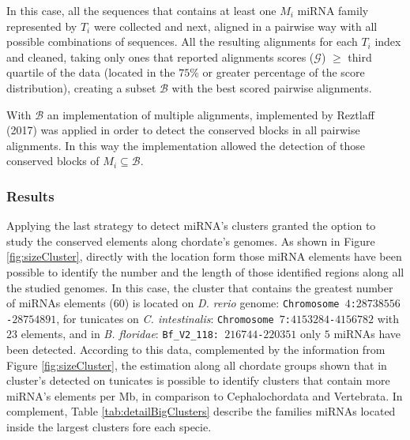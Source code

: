 \documentclass[11pt]{article}
\begin{document}
In this case, all the sequences that contains at least one $M_{i}$ miRNA family represented by $T_{i}$ were collected and next, aligned in a pairwise way with all possible combinations of sequences. All the resulting alignments for each $T_{i}$ index and cleaned, taking only ones that reported alignments scores ($\mathcal{G}$) $\ge$ third quartile of the data (located in the $75$\% or greater percentage of the score distribution), creating a subset $\mathcal{B}$ with the best scored pairwise alignments.

With $\mathcal{B}$ an implementation of multiple alignments, implemented by Reztlaff (2017) was applied in order to detect the conserved blocks in all pairwise alignments. In this way the implementation allowed the detection of those conserved blocks of $M_{i} \subseteq \mathcal{B}$.

\subsubsection*{Results}
 Applying the last strategy to detect miRNA's clusters granted the option to study the conserved elements along chordate's genomes. As shown in Figure \ref{fig:sizeCluster}, directly with the location form those miRNA elements have been possible to identify the number and the length of those identified regions along all the studied genomes. In this case, the cluster that contains the greatest number of miRNAs elements ($60$) is located on \textit{D. rerio} genome: \texttt{Chromosome $4$:$28738556$-$28754891$}, for tunicates on \textit{C. intestinalis}: \texttt{Chromosome $7$:$4153284$-$4156782$} with $23$ elements, and in \textit{B. floridae}: \texttt{Bf\_V2\_118: $216744$-$220351$} only $5$ miRNAs have been detected. According to this data, complemented by the information from Figure \ref{fig:sizeCluster}, the estimation along all chordate groups shown that in cluster's detected on tunicates is possible to identify clusters that contain more miRNA's elements per Mb, in comparison to Cephalochordata and Vertebrata. %
 In complement, Table \ref{tab:detailBigClusters} describe the families miRNAs 
located inside the largest clusters fore each specie.
\end{document}
